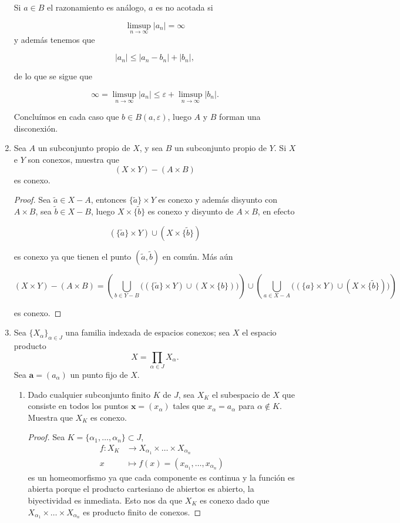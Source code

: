 \documentclass[11pt]{article}
\begin{document}
\begin{enumerate}
Si $a\in B$ el razonamiento es análogo, $a$ es no acotada si

$$\limsup_{n \to \infty}|a_n|=\infty$$
 y además tenemos que 

 $$|a_n|\leq |a_n-b_n|+|b_n|,$$

 de lo que se sigue que

 $$\infty=\limsup_{n \to \infty} |a_n|\leq \varepsilon +\limsup_{n \to \infty} |b_n|.$$

Concluímos en cada caso que $b\in B(a,\varepsilon)$, luego $A$ y $B$ forman una disconexión.

\item Sea $A$ un subconjunto propio de $X$, y sea $B$ un subconjunto propio de $Y$. Si $X$ e $Y$ son conexos, muestra que
    \[
    (X \times Y) - (A \times B)
    \]
    es conexo.

\begin{proof}
    Sea $\tilde{a}\in X-A$, entonces $\{\tilde{a}\}\times Y$ es conexo y además disyunto con $A\times B$, sea $\tilde{b}\in X-B$, luego $X\times \{\tilde{b}\}$ es conexo  y disyunto de $A\times B$, en efecto 

    $$(\{\tilde{a}\}\times Y)\cup (X\times \{\tilde{b}\})$$

es conexo ya que tienen el punto $(\tilde{a},\tilde{b})$ en común. Más aún

$$(X\times Y)-(A\times B)=\left(\bigcup_{b\in Y-B}\big((\{\tilde{a}\}\times Y)\cup (X\times \{b\})\big)\right) \cup \left(\bigcup_{a\in X-A}\big((\{a\}\times Y)\cup(X\times \{\tilde{b}\}) \big)\right) 
$$

es conexo.
\end{proof}

    \item Sea $\{X_\alpha\}_{\alpha \in J}$ una familia indexada de espacios conexos; sea $X$ el espacio producto
    \[
    X = \prod_{\alpha \in J} X_\alpha.
    \]
    Sea $\mathbf{a} = (a_\alpha)$ un punto fijo de $X$.
    \begin{enumerate}
        \item Dado cualquier subconjunto finito $K$ de $J$, sea $X_K$ el subespacio de $X$ que consiste en todos los puntos $\mathbf{x} = (x_\alpha)$ tales que $x_\alpha = a_\alpha$ para $\alpha \notin K$. Muestra que $X_K$ es conexo.

        \begin{proof}
            Sea $K=\{\alpha_1,\ldots,\alpha_n\}\subset J$,
                \begin{align*}
                    f : X_K &\longrightarrow X_{\alpha_1}\times\ldots\times X_{\alpha_n} \\
                    x &\longmapsto f(x) = (x_{\alpha_1},\ldots,x_{\alpha_n})
                \end{align*}
es un homeomorfismo ya que cada componente es continua y la función es abierta porque el producto cartesiano de abiertos es abierto, la biyectividad es inmediata. Esto nos da que $X_K$ es conexo dado que $X_{\alpha_1}\times\ldots\times X_{\alpha_n}$ es producto finito de conexos.


\end{proof}
\end{enumerate}
\end{enumerate}
\end{document}
